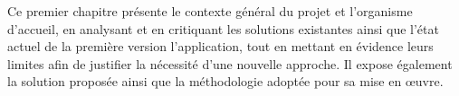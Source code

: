 Ce premier chapitre présente le contexte général du projet et l’organisme d’accueil, en analysant et en critiquant les solutions existantes ainsi que l’état actuel de la première version l’application, tout en mettant en évidence leurs limites afin de justifier la nécessité d’une nouvelle approche. Il expose également la solution proposée ainsi que la méthodologie adoptée pour sa mise en œuvre.